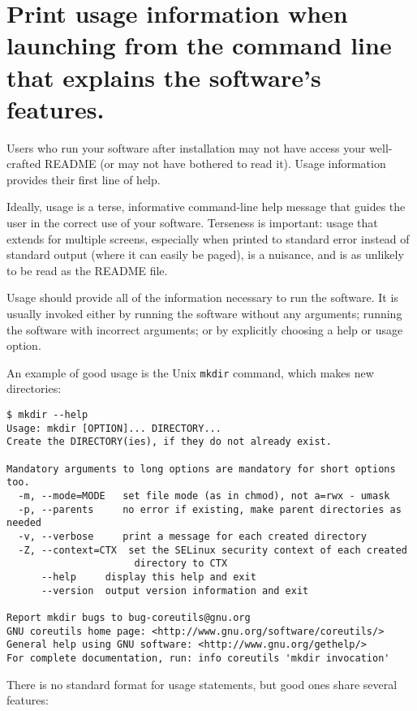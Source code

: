 \documentclass[10pt]{article}
\begin{document}
\section{Print usage information when launching from the command line that explains the software's features.}

Users who run your software after installation may not have access your
well-crafted README (or may not have bothered to read it). Usage
information provides their first line of help.

Ideally, usage is a terse, informative command-line help message that
guides the user in the correct use of your software. Terseness is
important: usage that extends for multiple screens, especially when
printed to standard error instead of standard output (where it can
easily be paged), is a nuisance, and is as unlikely to be read as the
README file.

Usage should provide all of the information necessary to run the
software. It is usually invoked either by running the software without
any arguments; running the software with incorrect arguments; or by
explicitly choosing a help or usage option.

An example of good usage is the Unix \texttt{mkdir} command, which makes
new directories:

\begin{small}
\begin{verbatim}
$ mkdir --help
Usage: mkdir [OPTION]... DIRECTORY...
Create the DIRECTORY(ies), if they do not already exist.

Mandatory arguments to long options are mandatory for short options too.
  -m, --mode=MODE   set file mode (as in chmod), not a=rwx - umask
  -p, --parents     no error if existing, make parent directories as needed
  -v, --verbose     print a message for each created directory
  -Z, --context=CTX  set the SELinux security context of each created
                      directory to CTX
      --help     display this help and exit
      --version  output version information and exit

Report mkdir bugs to bug-coreutils@gnu.org
GNU coreutils home page: <http://www.gnu.org/software/coreutils/>
General help using GNU software: <http://www.gnu.org/gethelp/>
For complete documentation, run: info coreutils 'mkdir invocation'
\end{verbatim}
\end{small}

There is no standard format for usage statements, but good ones share
several features:
\end{document}
